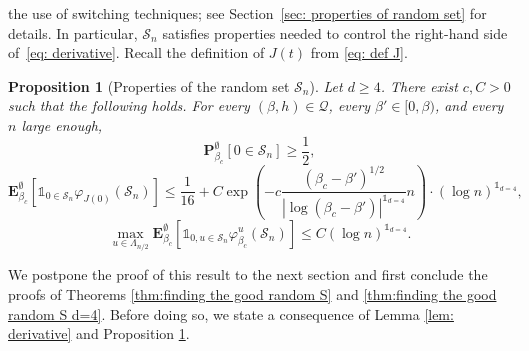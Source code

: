 \documentclass[10pt,a4paper]{amsart}
\numberwithin{equation}{section}
\newtheorem{Prop}[Thm]{Proposition}
\begin{document}
the use of switching techniques; see Section~\ref{sec: properties of 
random set} for details. In particular, $\mathcal{S}_n$ satisfies properties needed to control the right-hand side of~\eqref{eq: derivative}. Recall the definition of $J(t)$ from \eqref{eq: def J}. 
\begin{Prop}[Properties of the random set $\mathcal S_n$]\label{prop:properties of the random set} Let $d\geq 4$. There exist $c,C>0$ such that the following holds.  For every $(\beta,h)\in \mathcal Q$, every $\beta'\in [0,\beta)$, and every $n$ large enough,
\begin{equation}\label{eq:prop 1}
	\mathbf P_{\beta_c}^\emptyset[0\in \mathcal S_n]\geq \frac{1}{2},
\end{equation}
\begin{equation}\label{eq:prop 2}
	\mathbf E_{\beta_c}^{\emptyset}[\mathds{1}_{0\in \mathcal S_n}\varphi_{J(0)}(\mathcal S_n)]\leq \frac{1}{16}+ C\exp\left(-c\frac{(\beta_c-\beta')^{1/2}}{|\log (\beta_c-\beta')|^{\mathds{1}_{d=4}}} n\right)\cdot (\log n)^{\mathds{1}_{d=4}},
\end{equation}
\begin{equation}\label{eq:prop 3}
	\max_{u\in \Lambda_{n/2}}\mathbf E_{\beta_c}^\emptyset[\mathds{1}_{0,u\in \mathcal S_n}\varphi_{\beta_c}^u(\mathcal S_n)]\leq C(\log n)^{\mathds{1}_{d=4}}.
\end{equation}
\end{Prop}

We postpone the proof of this result to the next section and first conclude the proofs of Theorems \ref{thm:finding the good random S} and \ref{thm:finding the good random S d=4}. Before doing so, we state a consequence of Lemma \ref{lem: derivative} and Proposition \ref{prop:properties of the random set}.
\end{document}
